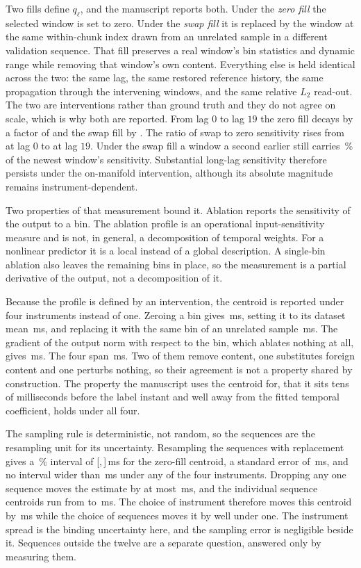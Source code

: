 \documentclass[10pt,twocolumn,letterpaper]{article}
\begin{document}
Two fills define $q_{\ell}$, and the manuscript reports both. Under the \emph{zero fill}
the selected window is set to zero. Under the \emph{swap fill} it is replaced by the window
at the same within-chunk index drawn from an unrelated sample in a different validation
sequence. That fill preserves a real window's bin statistics and dynamic range while removing
that window's own content. Everything else is held identical across the two: the same lag,
the same restored reference history, the same propagation through the intervening windows,
and the same relative $L_{2}$ read-out. The two are interventions rather than ground truth
and they do not agree on scale, which is why both are reported. From lag $0$ to lag $19$ the
zero fill decays by a factor of \histDecayZero{} and the swap fill by \histDecaySwap{}. The
ratio of swap to zero sensitivity rises from \histSwapRatioLo{} at lag $0$ to
\histSwapRatioHi{} at lag $19$. Under the swap fill a window a second earlier still carries
\histTailSwapPct\,\% of the newest window's sensitivity. Substantial long-lag sensitivity
therefore persists under the on-manifold intervention, although its absolute magnitude remains
instrument-dependent.

Two properties of that measurement bound it. Ablation reports the sensitivity of
the output to a bin. The ablation profile is an operational input-sensitivity
measure and is not, in general, a decomposition of temporal weights. For a
nonlinear predictor it is a local instead of a global description. A single-bin ablation also leaves the remaining bins in place, so the measurement is a partial
derivative of the output, not a decomposition of it.

Because the profile is defined by an intervention, the centroid is reported under four
instruments instead of one. Zeroing a bin gives \occZero\,ms, setting it to its dataset
mean \occMean\,ms, and replacing it with the same bin of an unrelated sample \occSwap\,ms.
The gradient of the output norm with respect to the bin, which ablates nothing at all, gives
\occGrad\,ms. The four span \occSpread\,ms. Two of them remove content, one substitutes
foreign content and one perturbs nothing, so their agreement is not a property shared by
construction. The property the manuscript uses the centroid for, that it sits tens of milliseconds
before the label instant and well away from the fitted temporal coefficient, holds under
all four.

The sampling rule is deterministic, not random, so the sequences are the resampling
unit for its uncertainty. Resampling the \occSeqs{} sequences with replacement gives a
\bootCI\,\% interval of [\occSeqCiLo,\,\occSeqCiHi]\,ms for the zero-fill centroid, a standard
error of \occSeqSE\,ms, and no interval wider than \occSeqWidest\,ms under any of the four
instruments. Dropping any one sequence moves the estimate by at most \occSeqLoo\,ms, and the
individual sequence centroids run from \occPerSeqLo{} to \occPerSeqHi\,ms. The choice of
instrument therefore moves this centroid by \occSpread\,ms while the choice of sequences moves
it by well under one. The instrument spread is the binding uncertainty here, and the sampling error is
negligible beside it. Sequences outside the twelve are a separate
question, answered only by measuring them.
\end{document}
